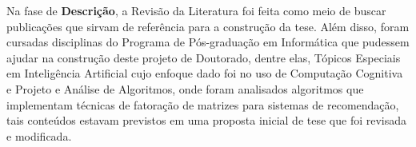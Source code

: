 





Na fase de \textbf{Descrição}, a Revisão da Literatura foi feita como meio de buscar publicações que sirvam de referência para a construção da tese. Além disso, foram cursadas disciplinas do Programa de Pós-graduação em Informática que pudessem ajudar na construção deste projeto de Doutorado, dentre elas, Tópicos Especiais em Inteligência Artificial cujo enfoque dado foi no uso de Computação Cognitiva e Projeto e Análise de Algoritmos, onde foram analisados algoritmos que implementam técnicas de fatoração de matrizes para sistemas de recomendação, tais conteúdos estavam previstos em uma proposta inicial de tese que foi revisada e modificada.

